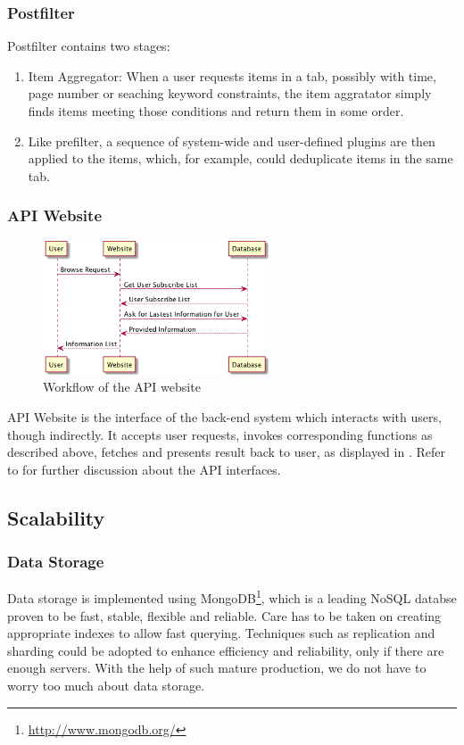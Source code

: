 \subsubsection{Postfilter}

Postfilter contains two stages:

\begin{enumerate}
\def\labelenumi{\arabic{enumi}.}
\itemsep1pt\parskip0pt
\item
  Item Aggregator: When a user requests items in a tab, possibly with
  time, page number or seaching keyword constraints, the item aggratator
  simply finds items meeting those conditions and return them in some
  order.
\item
  Like prefilter, a sequence of system-wide and user-defined plugins are
  then applied to the items, which, for example, could deduplicate items
  in the same tab.
\end{enumerate}

\subsubsection{API Website}

\begin{figure}[H]
  \centering
  \includegraphics[width=0.6\textwidth]{img/browse.png}
  \caption{Workflow of the API website\label{fig:website}}
\end{figure}


API Website is the interface of the back-end system which interacts with
users, though indirectly. It accepts user requests, invokes
corresponding functions as described above, fetches and presents result
back to user, as displayed in . Refer to  for further discussion about the API interfaces.

\subsection{Scalability}

\subsubsection{Data Storage}
\label{sec:data}
Data storage is implemented using MongoDB\footnote{\url{http://www.mongodb.org/}},
which is a leading NoSQL databse proven to be fast, stable, flexible and reliable.
Care has to be taken on creating
appropriate indexes to allow fast querying. Techniques such as
replication and sharding could be adopted to enhance efficiency and
reliability, only if there are enough servers. With the help of such
mature production, we do not have to worry too much about data storage.

